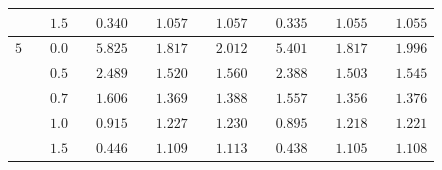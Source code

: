 \documentclass[twoside]{article}
\begin{document}
\begin{table}[h]
\begin{center}
\begin{tabular}{ | c | c c | c c c c c c | c c c c c c c | }
\\   
\multicolumn{1}{|c}{} & 
\multicolumn{1}{c}{} & 
\multicolumn{1}{c}{$ 1.5 $} & 
\multicolumn{1}{c}{} & 
\multicolumn{1}{c}{$ 0.340 $} &   
\multicolumn{1}{c}{} & 
\multicolumn{1}{c}{$ 1.057 $} & 
\multicolumn{1}{c}{} & 
\multicolumn{1}{c}{$ 1.057 $}  &
\multicolumn{2}{c}{} & 
\multicolumn{1}{c}{$ 0.335 $} &   
\multicolumn{1}{c}{} & 
\multicolumn{1}{c}{$ 1.055 $} & 
\multicolumn{1}{c}{} & 
\multicolumn{1}{c|}{$ 1.055 $}  
\\ 
\hline
\multicolumn{1}{|c}{$ 5 $} & 
\multicolumn{1}{c}{} & 
\multicolumn{1}{c}{$ 0.0 $} & 
\multicolumn{1}{c}{} & 
\multicolumn{1}{c}{$ 5.825 $} &   
\multicolumn{1}{c}{} & 
\multicolumn{1}{c}{$ 1.817 $} & 
\multicolumn{1}{c}{} & 
\multicolumn{1}{c}{$ 2.012 $} &
\multicolumn{2}{c}{} & 
\multicolumn{1}{c}{$ 5.401 $} &   
\multicolumn{1}{c}{} & 
\multicolumn{1}{c}{$ 1.817 $} & 
\multicolumn{1}{c}{} & 
\multicolumn{1}{c|}{$ 1.996 $} 
\\
\multicolumn{1}{|c}{} & 
\multicolumn{1}{c}{} & 
\multicolumn{1}{c}{$ 0.5 $} & 
\multicolumn{1}{c}{} & 
\multicolumn{1}{c}{$ 2.489 $} &   
\multicolumn{1}{c}{} & 
\multicolumn{1}{c}{$ 1.520 $} & 
\multicolumn{1}{c}{} & 
\multicolumn{1}{c}{$ 1.560 $} &
\multicolumn{2}{c}{} & 
\multicolumn{1}{c}{$ 2.388 $} &   
\multicolumn{1}{c}{} & 
\multicolumn{1}{c}{$ 1.503 $} & 
\multicolumn{1}{c}{} & 
\multicolumn{1}{c|}{$ 1.545 $} 
\\
\multicolumn{1}{|c}{} & 
\multicolumn{1}{c}{} & 
\multicolumn{1}{c}{$ 0.7 $} & 
\multicolumn{1}{c}{} & 
\multicolumn{1}{c}{$ 1.606 $} &   
\multicolumn{1}{c}{} & 
\multicolumn{1}{c}{$ 1.369 $} & 
\multicolumn{1}{c}{} & 
\multicolumn{1}{c}{$ 1.388 $} &
\multicolumn{2}{c}{} & 
\multicolumn{1}{c}{$ 1.557 $} &   
\multicolumn{1}{c}{} & 
\multicolumn{1}{c}{$ 1.356 $} & 
\multicolumn{1}{c}{} & 
\multicolumn{1}{c|}{$ 1.376 $} 
\\
\multicolumn{1}{|c}{} & 
\multicolumn{1}{c}{} & 
\multicolumn{1}{c}{$ 1.0 $} & 
\multicolumn{1}{c}{} & 
\multicolumn{1}{c}{$ 0.915 $} &   
\multicolumn{1}{c}{} & 
\multicolumn{1}{c}{$ 1.227 $} & 
\multicolumn{1}{c}{} & 
\multicolumn{1}{c}{$ 1.230 $} &
\multicolumn{2}{c}{} & 
\multicolumn{1}{c}{$ 0.895 $} &   
\multicolumn{1}{c}{} & 
\multicolumn{1}{c}{$ 1.218 $} & 
\multicolumn{1}{c}{} & 
\multicolumn{1}{c|}{$ 1.221 $} 
\\
\multicolumn{1}{|c}{} & 
\multicolumn{1}{c}{} & 
\multicolumn{1}{c}{$ 1.5 $} & 
\multicolumn{1}{c}{} & 
\multicolumn{1}{c}{$ 0.446 $} &   
\multicolumn{1}{c}{} & 
\multicolumn{1}{c}{$ 1.109 $} & 
\multicolumn{1}{c}{} & 
\multicolumn{1}{c}{$ 1.113 $} &
\multicolumn{2}{c}{} & 
\multicolumn{1}{c}{$ 0.438 $} &   
\multicolumn{1}{c}{} & 
\multicolumn{1}{c}{$ 1.105 $} & 
\multicolumn{1}{c}{} & 
\multicolumn{1}{c|}{$ 1.108 $} 
\\ 
\hline
\end{tabular}
\end{center}
\end{table}
\end{document}
